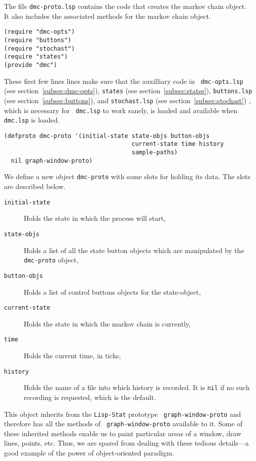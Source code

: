 The file {\tt dmc-proto.lsp} contains the code that creates the markov
chain object.  It also includes the associated methods for the markov
chain object. 
 
\begin{verbatim} 
(require "dmc-opts")
(require "buttons")
(require "stochast")
(require "states")
(provide "dmc")
\end{verbatim}

These first few lines lines make sure that the auxilliary code in {\tt
  dmc-opts.lsp} (see section~\ref{subsec:dmc-opts}), {\tt states}
(see section~\ref{subsec:states}), {\tt buttons.lsp} (see
section~\ref{subsec:buttons}), and {\tt stochast.lsp} (see
section~\ref{subsec:stochast}) , which is necessary for {\tt
  dmc.lsp} to work sanely, is loaded and available when {\tt dmc.lsp} is
loaded.
\begin{verbatim}
(defproto dmc-proto '(initial-state state-objs button-objs
                                    current-state time history
                                    sample-paths)
  nil graph-window-proto)
\end{verbatim}
We define a new object {\tt dmc-proto} with some slots for holding its
data. The slots are described below. 
\begin{description}
\item[{\tt initial-state}] Holds the state in which the process will
  start, 
\item[{\tt state-objs}] Holds a list of all the state button objects
  which are manipulated by the {\tt dmc-proto} object,
\item[{\tt button-objs}] Holds a list of control buttons objects for
  the state-object,
\item[{\tt current-state}] Holds the state in which the markov chain
  is currently,
\item[{\tt time}]  Holds the current time, in ticks,
\item[{\tt history}]  Holds the name of a file into which history is
  recorded. It is {\tt nil} if no such recording is requested, which
  is the default.
\end{description}
This object inherits from the {\tt Lisp-Stat} prototype {\tt
  graph-window-proto} and therefore has all the methods of {\tt
  graph-window-proto} available to it. Some of these inherited methods
enable us to paint particular areas of a window, draw lines, points,
etc. Thus, we are spared from dealing with these tedious details---a
good example of the power of object-oriented paradigm.  

